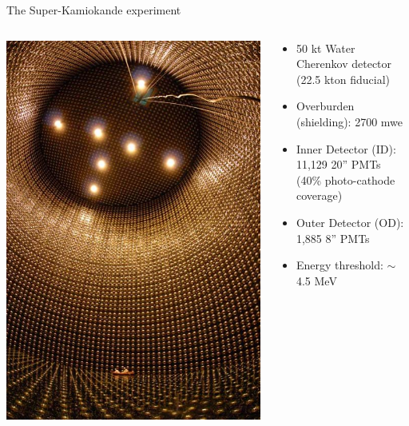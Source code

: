 %
%
%

\begin{frame}{The Super-Kamiokande experiment}
\begin{columns}
 \begin{column}{0.45\textwidth}
    \includegraphics[height=0.85\textheight]{./images/3nu/atmo/superk_inside_view_portrait_1.jpg}
 \end{column}
 \begin{column}{0.55\textwidth}
 {\small
 \begin{itemize}
   \item 50 kt Water Cherenkov detector\\ (22.5 kton fiducial)
   \item Overburden (shielding): 2700 mwe
   \item Inner Detector (ID): 11,129 20'' PMTs\\ (40\% photo-cathode coverage)
   \item Outer Detector (OD): 1,885 8'' PMTs
   \item Energy threshold: $\sim$ 4.5 MeV
 \end{itemize}
 }
 \end{column}
\end{columns}
\end{frame}

